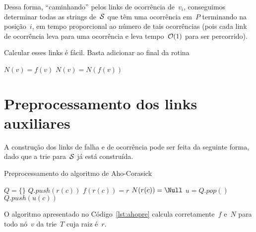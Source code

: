 Dessa forma, ``caminhando'' pelos links de ocorrência de~$v_i$, conseguimos determinar todas as strings de~$\mathcal{S}$ que têm uma ocorrência em~$P$ terminando na posição~$i$, em tempo proporcional ao número de tais ocorrências (pois cada link de ocorrência leva para uma ocorrência e leva tempo~$\mathcal{O}(1)$ para ser percorrido).

Calcular esses links é fácil. Basta adicionar ao final da rotina 

\begin{algorithm}[ht]
\begin{algorithmic}[1]
        \State $N(v) = f(v)$
    \Else
        \State $N(v) = N(f(v))$
    \EndIf
\EndFunction
\end{algorithmic}
\end{algorithm}

\section{Preprocessamento dos links auxiliares}
\label{sec:ahopre}

A construção dos links de falha e de ocorrência pode ser feita da seguinte forma, dado que a trie para~$\mathcal{S}$ já está construída.

\begin{algorithm}
\caption{Preprocessamento do algoritmo de Aho-Corasick}\label{lst:ahopre}
\begin{algorithmic}[1]
\State $Q = \{\}$ 
        \State $Q.push(r(c))$
        \State $f(r(c)) = r$
        \State $N(r(c)) = \Null$
    \EndIf
\EndFor
{}
    \State $u = Q.pop()$
            \State {}
            \State $Q.push(u(c))$
        \EndIf
    \EndFor
\EndWhile
\end{algorithmic}
\end{algorithm}

\begin{theorem}
O algoritmo apresentado no Código~\ref{lst:ahopre} calcula corretamente~$f$ e~$N$ para todo nó~$v$ da trie~$T$ cuja raiz é~$r$.
\end{theorem}

